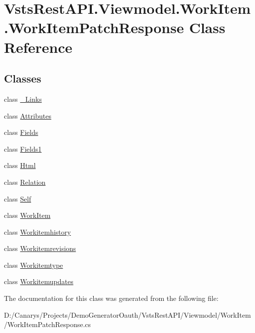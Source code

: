 \hypertarget{class_vsts_rest_a_p_i_1_1_viewmodel_1_1_work_item_1_1_work_item_patch_response}{}\section{Vsts\+Rest\+A\+P\+I.\+Viewmodel.\+Work\+Item.\+Work\+Item\+Patch\+Response Class Reference}
\label{class_vsts_rest_a_p_i_1_1_viewmodel_1_1_work_item_1_1_work_item_patch_response}
\subsection*{Classes}
\begin{DoxyCompactItemize}
\item 
class \mbox{\hyperlink{class_vsts_rest_a_p_i_1_1_viewmodel_1_1_work_item_1_1_work_item_patch_response_1_1___links}{\+\_\+\+Links}}
\item 
class \mbox{\hyperlink{class_vsts_rest_a_p_i_1_1_viewmodel_1_1_work_item_1_1_work_item_patch_response_1_1_attributes}{Attributes}}
\item 
class \mbox{\hyperlink{class_vsts_rest_a_p_i_1_1_viewmodel_1_1_work_item_1_1_work_item_patch_response_1_1_fields}{Fields}}
\item 
class \mbox{\hyperlink{class_vsts_rest_a_p_i_1_1_viewmodel_1_1_work_item_1_1_work_item_patch_response_1_1_fields1}{Fields1}}
\item 
class \mbox{\hyperlink{class_vsts_rest_a_p_i_1_1_viewmodel_1_1_work_item_1_1_work_item_patch_response_1_1_html}{Html}}
\item 
class \mbox{\hyperlink{class_vsts_rest_a_p_i_1_1_viewmodel_1_1_work_item_1_1_work_item_patch_response_1_1_relation}{Relation}}
\item 
class \mbox{\hyperlink{class_vsts_rest_a_p_i_1_1_viewmodel_1_1_work_item_1_1_work_item_patch_response_1_1_self}{Self}}
\item 
class \mbox{\hyperlink{class_vsts_rest_a_p_i_1_1_viewmodel_1_1_work_item_1_1_work_item_patch_response_1_1_work_item}{Work\+Item}}
\item 
class \mbox{\hyperlink{class_vsts_rest_a_p_i_1_1_viewmodel_1_1_work_item_1_1_work_item_patch_response_1_1_workitemhistory}{Workitemhistory}}
\item 
class \mbox{\hyperlink{class_vsts_rest_a_p_i_1_1_viewmodel_1_1_work_item_1_1_work_item_patch_response_1_1_workitemrevisions}{Workitemrevisions}}
\item 
class \mbox{\hyperlink{class_vsts_rest_a_p_i_1_1_viewmodel_1_1_work_item_1_1_work_item_patch_response_1_1_workitemtype}{Workitemtype}}
\item 
class \mbox{\hyperlink{class_vsts_rest_a_p_i_1_1_viewmodel_1_1_work_item_1_1_work_item_patch_response_1_1_workitemupdates}{Workitemupdates}}
\end{DoxyCompactItemize}


The documentation for this class was generated from the following file\+:\begin{DoxyCompactItemize}
\item 
D\+:/\+Canarys/\+Projects/\+Demo\+Generator\+Oauth/\+Vsts\+Rest\+A\+P\+I/\+Viewmodel/\+Work\+Item/Work\+Item\+Patch\+Response.\+cs\end{DoxyCompactItemize}
